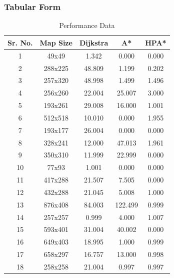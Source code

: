 \documentclass[a4paper, 12pt]{article}
\begin{document}
\subsubsection{Tabular Form}
\begin{table}[h!]
 \caption{Performance Data}
\begin{center}
\begin{tabular}{| c | c | c | c | c |}
\hline
Sr. No. & Map Size & Dijkstra & A* & HPA* \\
\hline
1 & 49x49 & 1.342 & 0.000 & 0.000 \\
2 & 288x225 & 48.809 & 1.199 & 0.202 \\
3 & 257x320 & 48.998 & 1.499 & 1.496 \\
4 & 256x260 & 22.004 & 25.007 & 3.000 \\
5 & 193x261 & 29.008 & 16.000 & 1.001 \\
6 & 512x518 & 10.010 & 0.000 & 1.955 \\
7 & 193x177 & 26.004 & 0.000 & 0.000 \\
8 & 328x241 & 12.000 & 47.013 & 1.961 \\
9 & 350x310 & 11.999 & 22.999 & 0.000 \\
10 & 77x93 & 1.001 & 0.000 & 0.000 \\
11 & 417x288 & 21.507 & 7.505 & 0.000 \\
12 & 432x288 & 21.045 & 5.008 & 1.000 \\
13 & 876x408 & 84.003 & 122.499 & 0.999 \\
14 & 257x257 & 0.999 & 4.000 & 1.007 \\
15 & 593x401 & 31.004 & 40.002 & 0.000 \\
16 & 649x403 & 18.995 & 1.000 & 0.999 \\
17 & 658x297 & 16.757 & 13.000 & 0.998 \\
18 & 258x258 & 21.004 & 0.997 & 0.997 \\
\hline
\end{tabular}
\end{center}
\end{table}
\vspace{1cm}
\end{document}
